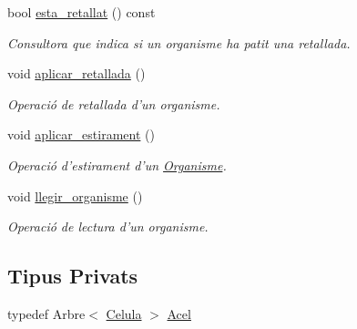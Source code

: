 \begin{DoxyCompactItemize}
bool \hyperlink{class_organisme_ae580c3261f7dd221e1c5a6bd887a22f2}{esta\-\_\-retallat} () const 
\begin{DoxyCompactList}\small\item\em Consultora que indica si un organisme ha patit una retallada. \end{DoxyCompactList}\item 
void \hyperlink{class_organisme_ab2ce3d76f757040f0c4acfedfada5561}{aplicar\-\_\-retallada} ()
\begin{DoxyCompactList}\small\item\em Operació de retallada d'un organisme. \end{DoxyCompactList}\item 
void \hyperlink{class_organisme_ac5e67e65649b3254de9503bd126ecffa}{aplicar\-\_\-estirament} ()
\begin{DoxyCompactList}\small\item\em Operació d'estirament d'un \hyperlink{class_organisme}{Organisme}. \end{DoxyCompactList}\item 
void \hyperlink{class_organisme_a056a9402130c7081b608838ba9ef2a30}{llegir\-\_\-organisme} ()
\begin{DoxyCompactList}\small\item\em Operació de lectura d'un organisme. \end{DoxyCompactList}\end{DoxyCompactItemize}
\subsection*{Tipus Privats}
\begin{DoxyCompactItemize}
\item 
typedef Arbre$<$ \hyperlink{class_celula}{Celula} $>$ \hyperlink{class_organisme_a6322ecf5313caa7df794a33c4fc58f4e}{Acel}
\end{DoxyCompactItemize}
